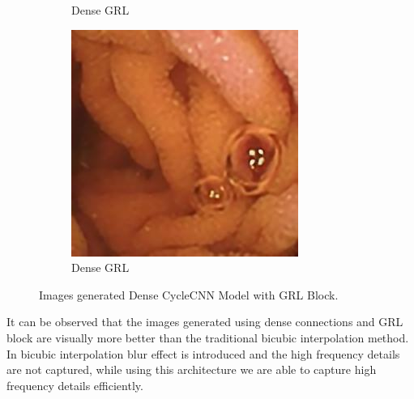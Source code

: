 \begin{figure}[H]
\begin{subfigure}[b]{0.32\textwidth}
    \caption{Dense GRL}
  \end{subfigure}
  \begin{subfigure}[b]{0.32\textwidth}
    \includegraphics[width=\textwidth]{Chapter7/Dense_456.jpg}
    \caption{Dense GRL}
  \end{subfigure}
    \caption[Images generated Dense CycleCNN Model with GRL Block.]{Images generated Dense CycleCNN Model with GRL Block.}
    \label{fig:label7.2}
\end{figure}
It can be observed that the images generated using dense connections and GRL block are visually more better than the traditional bicubic interpolation method. In bicubic interpolation blur effect is introduced and the high frequency details are not captured, while using this architecture we are able to capture high frequency details efficiently.

